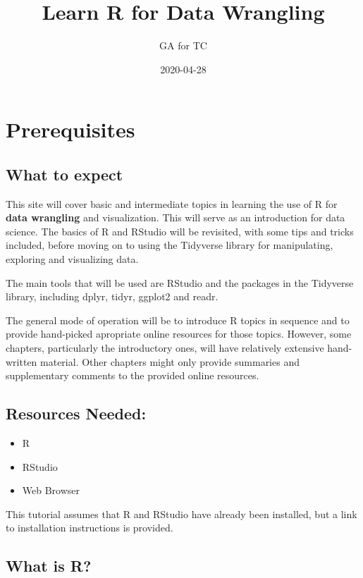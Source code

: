 \documentclass[]{book}
\title{Learn R for Data Wrangling}
\author{GA for TC}
\date{2020-04-28}
\providecommand{\tightlist}{%
  \setlength{\itemsep}{0pt}\setlength{\parskip}{0pt}}
\begin{document}
\maketitle

{
\setcounter{tocdepth}{1}
\tableofcontents
}
\hypertarget{prerequisites}{%
\chapter{Prerequisites}\label{prerequisites}}

\hypertarget{what-to-expect}{%
\section{What to expect}\label{what-to-expect}}

This site will cover basic and intermediate topics in learning the use of R for \textbf{data wrangling} and visualization. This will serve as an introduction for data science. The basics of R and RStudio will be revisited, with some tips and tricks included, before moving on to using the Tidyverse library for manipulating, exploring and visualizing data.

The main tools that will be used are RStudio and the packages in the Tidyverse library, including dplyr, tidyr, ggplot2 and readr.

The general mode of operation will be to introduce R topics in sequence and to provide hand-picked apropriate online resources for those topics. However, some chapters, particularly the introductory ones, will have relatively extensive hand-written material. Other chapters might only provide summaries and supplementary comments to the provided online resources.

\hypertarget{resources-needed}{%
\section{Resources Needed:}\label{resources-needed}}

\begin{itemize}
\tightlist
\item
  R
\item
  RStudio
\item
  Web Browser
\end{itemize}

This tutorial assumes that R and RStudio have already been installed, but a link to installation instructions is provided.

\hypertarget{what-is-r}{%
\section{What is R?}\label{what-is-r}}
\end{document}
